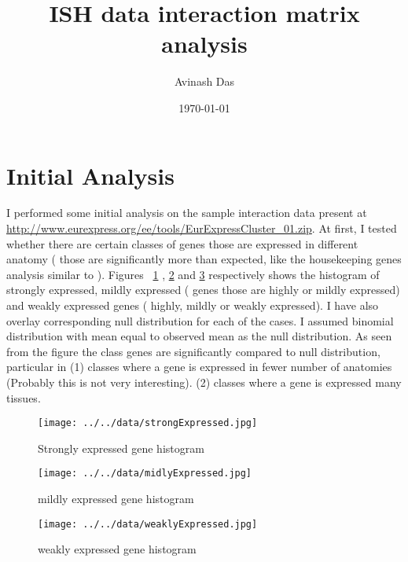 \documentclass{article}
\title{
ISH data interaction matrix analysis
}
\author{Avinash Das}
\date{\today}
\begin{document}
\pagestyle{fancy}

\maketitle

\section{Initial Analysis}
I performed some initial analysis on the sample interaction data present at \url{http://www.eurexpress.org/ee/tools/EurExpressCluster_01.zip}.
At first, I tested whether there are certain classes of genes those are expressed in different anatomy ( those are significantly more than expected, like the housekeeping genes analysis similar to \cite{eisenberg2003human}). Figures ~\ref{fig:strongHist} , \ref{fig:mildlyHist} and \ref{fig:weaklyHist} respectively shows the histogram of strongly expressed, mildly expressed ( genes those are highly or mildly expressed) and weakly expressed genes ( highly, mildly or weakly expressed).  
I have also overlay corresponding null distribution for each of the cases. I assumed binomial distribution with mean equal to observed mean as the null distribution. 
As seen from the figure the class genes are significantly compared to null distribution, particular in (1) classes where a gene is expressed in fewer number of anatomies (Probably this is not very interesting). (2) classes where a gene is expressed many tissues. 

\begin{figure}
	\begin{center}
		\texttt{[image: ../../data/strongExpressed.jpg]}
	\end{center}
	\caption{Strongly expressed  gene histogram }
	\label{fig:strongHist}
\end{figure}

\begin{figure}	
	\begin{center}
		\texttt{[image: ../../data/midlyExpressed.jpg]}
	\end{center}
	\caption{mildly expressed gene histogram}
	\label{fig:mildlyHist}
\end{figure}

\begin{figure}
	\begin{center}
		\texttt{[image: ../../data/weaklyExpressed.jpg]}
	\end{center}
	\caption{weakly expressed gene histogram}
	\label{fig:weaklyHist}
\end{figure}
\end{document}
